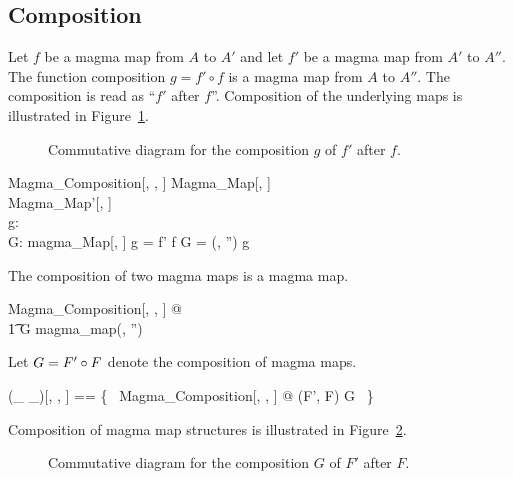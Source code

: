 \documentclass{amsart}
\begin{document}
\subsection{Composition}

Let $f$ be a magma map from $A$ to $A'$ and let $f'$ be a magma map from $A'$ to $A''$.
The function composition $g = f' \circ f$ is a magma map from $A$ to $A''$.
The composition is read as ``$f'$ after $f$''.
Composition of the underlying maps is illustrated in Figure~\ref{fig:map-composition-diagram}.

\begin{figure}[h]
    \caption{Commutative diagram for the composition $g$ of $f'$ after $f$.}
    \label{fig:map-composition-diagram}
\end{figure}

\begin{schema}{Magma\_Composition}[\genT, \genU, \genV]
	Magma\_Map[\genT, \genU] \\
	Magma\_Map'[\genU, \genV] \\
	g: \genT \pfun \genV  \\
	G: magma\_Map[\genT, \genV]
\where
	g = f' \circ f
\also
	G = (\strucA, \strucA'') \mapsto g
\end{schema}

\begin{remark}
The composition of two magma maps is a magma map.

\begin{zed}
	\forall Magma\_Composition[\setT, \setU, \setV] @ \\
	\t1	G \in magma\_map(\strucA, \strucA'')
\end{zed}

\end{remark}

Let $G = F' \mathbin{\circ} F$ denote the composition of magma maps.

\begin{zed}
	(\_ \compMagma \_)[\genT, \genU, \genV] == \{~ Magma\_Composition[\genT, \genU, \genV] @ (F', F) \mapsto G ~\}
\end{zed}

Composition of magma map structures is illustrated in Figure~\ref{fig:magma-map-composition-diagram}.

\begin{figure}[h]
    \caption{Commutative diagram for the composition $G$ of $F'$ after $F$.}
    \label{fig:magma-map-composition-diagram}
\end{figure}
\end{document}
